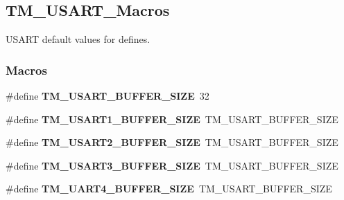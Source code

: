 \hypertarget{group___t_m___u_s_a_r_t___macros}{}\subsection{T\+M\+\_\+\+U\+S\+A\+R\+T\+\_\+\+Macros}
\label{group___t_m___u_s_a_r_t___macros}


U\+S\+A\+R\+T default values for defines.  


\subsubsection*{Macros}
\begin{DoxyCompactItemize}
\item 
\hypertarget{group___t_m___u_s_a_r_t___macros_ga7e44de65b9fb753b0d64ae79f315e87f}{}\#define {\bfseries T\+M\+\_\+\+U\+S\+A\+R\+T\+\_\+\+B\+U\+F\+F\+E\+R\+\_\+\+S\+I\+Z\+E}~32\label{group___t_m___u_s_a_r_t___macros_ga7e44de65b9fb753b0d64ae79f315e87f}

\item 
\hypertarget{group___t_m___u_s_a_r_t___macros_ga0eedcc6b2579cedb6c36074374275d6a}{}\#define {\bfseries T\+M\+\_\+\+U\+S\+A\+R\+T1\+\_\+\+B\+U\+F\+F\+E\+R\+\_\+\+S\+I\+Z\+E}~T\+M\+\_\+\+U\+S\+A\+R\+T\+\_\+\+B\+U\+F\+F\+E\+R\+\_\+\+S\+I\+Z\+E\label{group___t_m___u_s_a_r_t___macros_ga0eedcc6b2579cedb6c36074374275d6a}

\item 
\hypertarget{group___t_m___u_s_a_r_t___macros_gadb171554c7cfa7cce25234be3fda93b0}{}\#define {\bfseries T\+M\+\_\+\+U\+S\+A\+R\+T2\+\_\+\+B\+U\+F\+F\+E\+R\+\_\+\+S\+I\+Z\+E}~T\+M\+\_\+\+U\+S\+A\+R\+T\+\_\+\+B\+U\+F\+F\+E\+R\+\_\+\+S\+I\+Z\+E\label{group___t_m___u_s_a_r_t___macros_gadb171554c7cfa7cce25234be3fda93b0}

\item 
\hypertarget{group___t_m___u_s_a_r_t___macros_ga4dca6522070228679cbaed4e505866f7}{}\#define {\bfseries T\+M\+\_\+\+U\+S\+A\+R\+T3\+\_\+\+B\+U\+F\+F\+E\+R\+\_\+\+S\+I\+Z\+E}~T\+M\+\_\+\+U\+S\+A\+R\+T\+\_\+\+B\+U\+F\+F\+E\+R\+\_\+\+S\+I\+Z\+E\label{group___t_m___u_s_a_r_t___macros_ga4dca6522070228679cbaed4e505866f7}

\item 
\hypertarget{group___t_m___u_s_a_r_t___macros_ga0713514f69d9cd194b820687049492cc}{}\#define {\bfseries T\+M\+\_\+\+U\+A\+R\+T4\+\_\+\+B\+U\+F\+F\+E\+R\+\_\+\+S\+I\+Z\+E}~T\+M\+\_\+\+U\+S\+A\+R\+T\+\_\+\+B\+U\+F\+F\+E\+R\+\_\+\+S\+I\+Z\+E\label{group___t_m___u_s_a_r_t___macros_ga0713514f69d9cd194b820687049492cc}


\end{DoxyCompactItemize}
